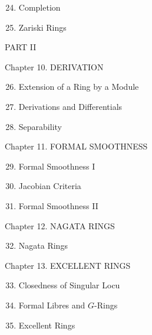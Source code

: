 \begin{enumerate}
  \setcounter{enumi}{23}
  \item Completion

  \item Zariski Rings

\end{enumerate}
PART II

Chapter 10. DERIVATION

\begin{enumerate}
  \setcounter{enumi}{25}
  \item Extension of a Ring by a Module

  \item Derivations and Differentials

  \item Separability

\end{enumerate}
Chapter 11. FORMAL SMOOTHNESS

\begin{enumerate}
  \setcounter{enumi}{28}
  \item Formal Smoothness I

  \item Jacobian Criteria

  \item Formal Smoothness II

\end{enumerate}
Chapter 12. NAGATA RINGS

\begin{enumerate}
  \setcounter{enumi}{31}
  \item Nagata Rings
\end{enumerate}
Chapter 13. EXCELLENT RINGS

\begin{enumerate}
  \setcounter{enumi}{32}
  \item Closedness of Singular Locu

  \item Formal Libres and $G$-Rings

  \item Excellent Rings

\end{enumerate}
